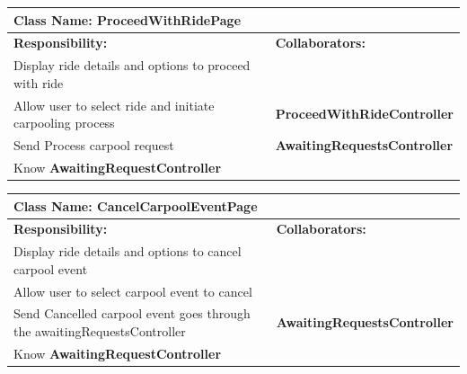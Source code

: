 \documentclass[]{article}
\begin{document}
\begin{table}[H]
    \centering
    \begin{tabular}{|p{5cm}|p{5cm}|}
        \hline 
        \multicolumn{2}{|l|}{\textbf{Class Name:} ProceedWithRidePage} \\
        \hline
        \textbf{Responsibility:} & \textbf{Collaborators:} \\
        \hline
        Display ride details and options to proceed with ride &  \phantom{} \\
        \hline
        Allow user to select ride and initiate carpooling process & \textbf{ProceedWithRideController} \\
        \hline
         Send Process carpool request & \textbf{AwaitingRequestsController} \\
        \hline
         Know \textbf{AwaitingRequestController}  & \phantom{} \\
    \hline
    \end{tabular}
\end{table}

\begin{table}[H]
    \centering
    \begin{tabular}{|p{5cm}|p{5cm}|}
        \hline 
        \multicolumn{2}{|l|}{\textbf{Class Name:} CancelCarpoolEventPage} \\
        \hline
        \textbf{Responsibility:} & \textbf{Collaborators:} \\
        \hline
        Display ride details and options to cancel carpool event &  \phantom{} \\
        \hline
        Allow user to select carpool event to cancel & \phantom{} \\
        \hline
        Send Cancelled carpool event goes through the awaitingRequestsController & \textbf{AwaitingRequestsController} \\
        \hline
        Know \textbf{AwaitingRequestController}  & \phantom{} \\
    \hline
    \end{tabular}
\end{table}
\end{document}
